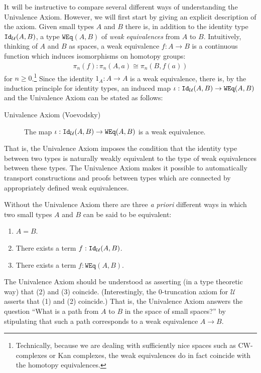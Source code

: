 \documentclass[11pt]{amsart}
\newcommand{\UU}{\mathcal{U}}
\newcommand{\iso}{\cong}
\newcommand{\id}[1]{\textnormal{\texttt{Id}}_{#1}}
\newcommand{\weq}{\texttt{WEq}}
\theoremstyle{definition}
\theoremstyle{remark}
\numberwithin{equation}{section}
\begin{document}
It will be instructive to compare several different ways of
understanding the Univalence Axiom.  However, we will first start by
giving an explicit description of the axiom.  Given small types $A$
and $B$ there is, in addition to the identity
type $\id{\UU}(A,B)$, a type $\weq(A,B)$ of \emph{weak equivalences}
from $A$ to $B$.  Intuitively, thinking of $A$ and $B$ as spaces, a
weak equivalence $f:A\to B$ is a continuous function which induces
isomorphisms on homotopy groups: 
\begin{align*}
  \pi_{n}(f):\pi_{n}(A,a)\iso\pi_{n}(B,f(a))
\end{align*}
for $n\geq 0$.\footnote{Technically, because we are dealing with
  sufficiently nice spaces such as CW-complexes or Kan complexes, the
  weak equivalences do in fact coincide with the homotopy equivalences.}
Since the identity $1_{A}:A\to A$ is a weak equivalence, there is, by
the induction principle for identity types, an induced map
$\iota:\id{\UU}(A,B)\to\weq(A,B)$ and the Univalence Axiom can be
stated as follows:
\begin{description}
\item[Univalence Axiom \textnormal{(Voevodsky)}] The map $\iota:\id{\UU}(A,B)\to\weq(A,B)$
  is a weak equivalence.
\end{description}
That is, the Univalence Axiom imposes the condition that the identity
type between two types is naturally weakly equivalent to the type of
weak equivalences between these types.  The Univalence Axiom makes it
possible to automatically transport constructions and proofs between
types which are connected by appropriately defined weak
equivalences.

Without the Univalence Axiom there are three \emph{a priori} different ways in which two small types
$A$ and $B$ can be said to be equivalent:
\begin{enumerate}
\item $A=B$.
\item There exists a term $f:\id{\UU}(A,B)$.
\item There exists a term $f:\weq(A,B)$.
\end{enumerate}
The Univalence Axiom should be understood as asserting (in a type
theoretic way) that (2) and (3) coincide.  (Interestingly, the
0-truncation axiom for $\UU$ asserts that (1) and (2)
coincide.)  That is, the Univalence Axiom answers the question ``What is a path from $A$ to $B$ in
the space of small spaces?'' by stipulating that such a path
corresponds to a weak equivalence $A\to B$.  
\end{document}
